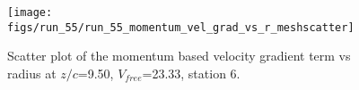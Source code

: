 \begin{figure}[H]
\centering
\texttt{[image: figs/run\_55/run\_55\_momentum\_vel\_grad\_vs\_r\_meshscatter]}
\caption{Scatter plot of the momentum based velocity gradient term vs radius at $z/c$=9.50, $V_{free}$=23.33, station 6.}
\label{fig:run_55_momentum_vel_grad_vs_r_meshscatter}
\end{figure}



